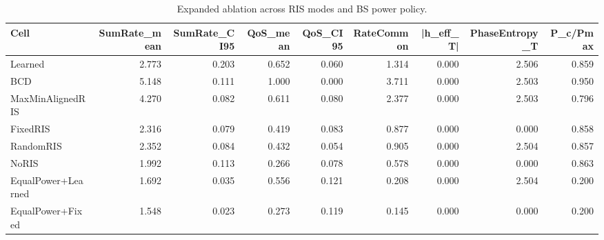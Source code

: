\begin{table}[t]
\centering
\caption{Expanded ablation across RIS modes and BS power policy.}
\label{tab:ablation}
\begin{tabular}{lrrrrrrrr}
\toprule
Cell & SumRate\_mean & SumRate\_CI95 & QoS\_mean & QoS\_CI95 & RateCommon & |h\_eff\_T| & PhaseEntropy\_T & P\_c/Pmax \\
\midrule
Learned & 2.773 & 0.203 & 0.652 & 0.060 & 1.314 & 0.000 & 2.506 & 0.859 \\
BCD & 5.148 & 0.111 & 1.000 & 0.000 & 3.711 & 0.000 & 2.503 & 0.950 \\
MaxMinAlignedRIS & 4.270 & 0.082 & 0.611 & 0.080 & 2.377 & 0.000 & 2.503 & 0.796 \\
FixedRIS & 2.316 & 0.079 & 0.419 & 0.083 & 0.877 & 0.000 & 0.000 & 0.858 \\
RandomRIS & 2.352 & 0.084 & 0.432 & 0.054 & 0.905 & 0.000 & 2.504 & 0.857 \\
NoRIS & 1.992 & 0.113 & 0.266 & 0.078 & 0.578 & 0.000 & 0.000 & 0.863 \\
EqualPower+Learned & 1.692 & 0.035 & 0.556 & 0.121 & 0.208 & 0.000 & 2.504 & 0.200 \\
EqualPower+Fixed & 1.548 & 0.023 & 0.273 & 0.119 & 0.145 & 0.000 & 0.000 & 0.200 \\
\bottomrule
\end{tabular}

\end{table}
